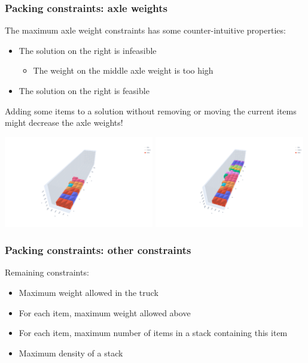 \documentclass[10pt]{beamer}
\begin{document}
\begin{frame}
  \frametitle{Packing constraints: axle weights}

  The maximum axle weight constraints has some counter-intuitive properties:
  \begin{itemize}
    \item The solution on the right is infeasible
      \begin{itemize}
        \item The weight on the middle axle weight is too high
      \end{itemize}
    \item The solution on the right is feasible
  \end{itemize}
  Adding some items to a solution without removing or moving the current items might decrease the axle weights!

  \begin{center}
    \includegraphics[trim=200 100 300 100,clip,width=0.49\textwidth]{img/axle_weight_infeasible.png}
    \includegraphics[trim=200 100 300 100,clip,width=0.49\textwidth]{img/axle_weight_feasible.png}
  \end{center}
  
\end{frame}

\begin{frame}
  \frametitle{Packing constraints: other constraints}

  Remaining constraints:
  \begin{itemize}
    \item Maximum weight allowed in the truck
    \item For each item, maximum weight allowed above
    \item For each item, maximum number of items in a stack containing this item
    \item Maximum density of a stack
  \end{itemize}
  
\end{frame}
\end{document}
